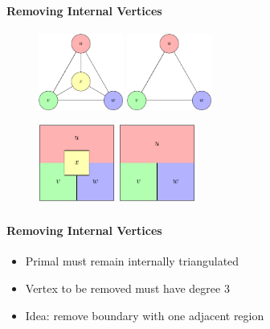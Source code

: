 \documentclass[t,18pt]{beamer}
\begin{document}
\begin{frame}[c]
  \frametitle{}
  \framesubtitle{Removing Internal Vertices}
  \begin{figure}
    \includegraphics[height=2.5cm]{../Thesis/Resources/RemoveVertex-Example-Internal-1.pdf}
    \quad
    \includegraphics[height=2.5cm]{../Thesis/Resources/RemoveVertex-Example-Internal-2.pdf}
  \end{figure}
  \begin{figure}
    \includegraphics[height=2.5cm]{../Thesis/Resources/RemoveVertex-Example-Internal-3.pdf}
    \qquad
    \includegraphics[height=2.5cm]{../Thesis/Resources/RemoveVertex-Example-Internal-4.pdf}
  \end{figure}
\end{frame}

\begin{frame}
  \frametitle{}
  \framesubtitle{Removing Internal Vertices}
  \begin{itemize}
    \item Primal must remain internally triangulated
    \item Vertex to be removed must have degree 3
    \vspace{1cm}
    \item<2-> Idea: remove boundary with one adjacent region
  \end{itemize}
\end{frame}
\end{document}
